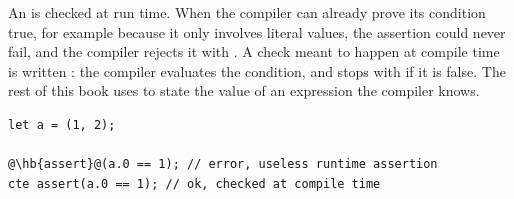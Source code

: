 An  is checked at run time. When the compiler can already prove its
condition true, for example because it only involves literal values, the
assertion could never fail, and the compiler rejects it with
. A check meant to happen at compile time is written :
the compiler evaluates the condition, and stops with
 if it is false. The rest of this book uses 
to state the value of an expression the compiler knows.

\begin{lstlisting}[style=coloredverbatimError, escapechar=@]
let a = (1, 2);

@\hb{assert}@(a.0 == 1); // error, useless runtime assertion
cte assert(a.0 == 1); // ok, checked at compile time
\end{lstlisting}

\vfill%
\pagebreak
